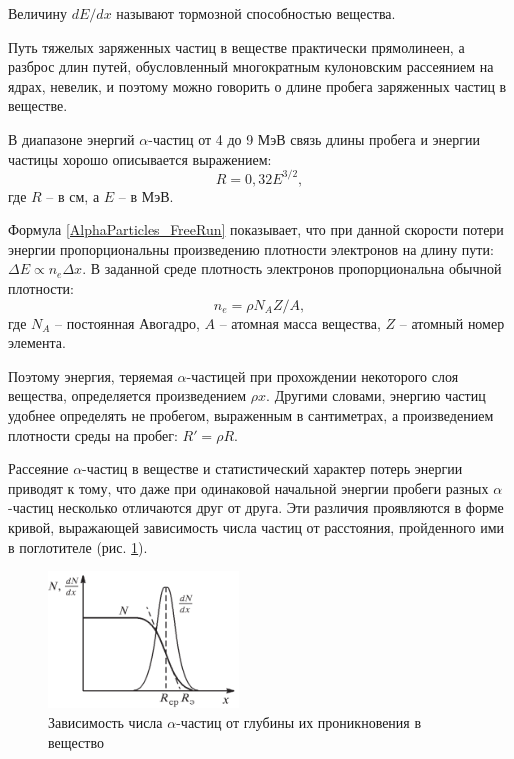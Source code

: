 	Величину $dE/dx$ называют тормозной способностью вещества.

	Путь тяжелых заряженных частиц в веществе практически прямолинеен, а разброс длин путей, обусловленный многократным кулоновским рассеянием на ядрах, невелик, и поэтому можно говорить о длине пробега заряженных частиц в веществе.


	В диапазоне энергий $\alpha$-частиц от 4 до 9 МэВ связь длины пробега и энергии частицы хорошо описывается выражением:
	\begin{equation}
		R = 0,32E^{3/2},
	\end{equation}
	\noindent где $R$ -- в см, а $E$ -- в МэВ.
	
	Формула \eqref{AlphaParticles_FreeRun} показывает, что при данной скорости потери энергии пропорциональны произведению плотности электронов на длину пути: $\Delta E \propto n_e \Delta x$. В заданной среде плотность электронов пропорциональна обычной плотности:
	\begin{equation}
		n_e = \rho N_A Z / A,
	\end{equation}
	\noindent где $N_A$ -- постоянная Авогадро, $A$ -- атомная масса вещества, $Z$ -- атомный номер элемента.
	
	Поэтому энергия, теряемая $\alpha$-частицей при прохождении некоторого слоя вещества, определяется произведением $\rho x$. Другими словами, энергию частиц удобнее определять не пробегом, выраженным в сантиметрах, а произведением плотности среды на пробег: $R' = \rho R$.
	
	Рассеяние $\alpha$-частиц в веществе и статистический характер потерь энергии приводят к тому, что даже при одинаковой начальной энергии пробеги разных $\alpha$-частиц несколько отличаются друг от друга. Эти различия проявляются в форме кривой, выражающей зависимость числа частиц от расстояния, пройденного ими в поглотителе (рис. \ref{AlphaParticles_N(x)_theory}).
	
	\begin{figure}
		\centering
		\includegraphics[width=0.45\textwidth]{Pictures/N(x)_theory}
		\caption{Зависимость числа $\alpha$-частиц от глубины их проникновения в вещество}
		\label{AlphaParticles_N(x)_theory}
	\end{figure}

